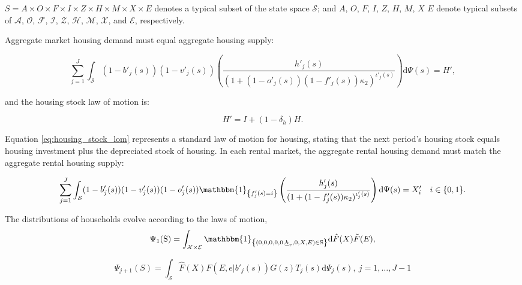 \documentclass[parskip=full]{article}
\newcommand{\indicator}[1]{\mathbbm{1}_{\left\{ {#1} \right\} }}
\begin{document}
$S=A\times O \times F \times I \times Z \times H\times M\times X \times E$ denotes a typical subset of the state space $\mathcal{S}$; and $A$, $O$, $F$, $I$, $Z$, $H$, $M$, $X$ $E$ denote typical subsets of $\mathcal{A}$, $\mathcal{O}$, $\mathcal{F}$, $\mathcal{I}$, $\mathcal{Z}$, $\mathcal{H}$, $\mathcal{M}$, $\mathcal{X}$, and $\mathcal{E}$, respectively.

Aggregate market housing demand must equal aggregate housing supply:

\begin{equation}
\label{eq:housing_clearing_condition}
  \sum_{j=1}^J \int_\mathcal{S} (1-b'_{j}(s))(1-v'_{j}(s)) \left(\frac{h'_{j}(s)}{(1+(1-o'_{j}(s))(1-f'_{j}(s))\kappa_{2})^{\iota'_{j}(s)}}\right) \mathrm{d}\Psi(s) = H',
\end{equation}

\noindent and the housing stock law of motion is: 

\begin{equation}\label{eq:housing_stock_lom}
H'=I+(1-\delta_h)H.
\end{equation}

\noindent Equation \eqref{eq:housing_stock_lom} represents a standard law of motion for housing, stating that the next period's housing stock equals housing investment plus the depreciated stock of housing. In each rental market, the aggregate rental housing demand must match the aggregate rental housing supply:

\begin{equation}\label{eq:rental_housing_clearing_condition}
  \sum_{j=1}^J \int_\mathcal{S} (1-b'_{j}(s))(1-v'_{j}(s)) (1-o'_{j}(s))\indicator{f'_{j}(s)=i}\left(\frac{h'_{j}(s)}{(1+(1-f'_{j}(s))\kappa_{2})^{\iota'_{j}(s)}}\right) \mathrm{d}\Psi(s) = X'_{i} \quad i \in \{0,1\}.
\end{equation}

The distributions of households evolve according to the laws of motion,
\begin{equation}\label{eq:lom1}
\Psi_{1}(\mathrm{S})=\int_{\mathcal{X} \times \mathcal{E}} \indicator{(0,0,0,0,0,\underline{h}_{r},0,X,E)\in \mathrm{S}}\mathrm{d} \hat{F}(X)\tilde{F}(E),
\end{equation}


\begin{equation}\label{eq:lom2}
\Psi_{j+1}(S)=\int_{\mathcal{S}} \hat{F}(X)F(E,e|b'_{j}(s))G(z)T_{j}(s)\mathrm{d}\Psi_{j}(s),\ j=1,\ldots,J-1
\end{equation}
\end{document}
